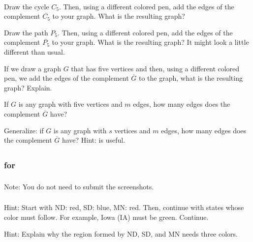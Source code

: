 \begin{exer}[\exerE] %
\label{exer_size_graph_comp}
~
    \begin{exerpart}
        \item Draw the cycle $C_5$. Then, using a different colored pen, add the edges of the complement $\overline{C_5}$ to your graph. What is the resulting graph?
        \item Draw the path $P_5$. Then, using a different colored pen, add the edges of the complement $\overline{P_5}$ to your graph. What is the resulting graph?  It might look a little different than usual.
        \item If we draw a graph $G$ that has five vertices and then, using a different colored pen, we add the edges of the complement $\overline{G}$ to the graph, what is the resulting graph?  Explain.
        \item If $G$ is any graph with five vertices and $m$ edges, how many edges does the complement $\overline{G}$ have?
        \item Generalize: if $G$ is any graph with $s$ vertices and $m$ edges, how many edges does the complement $\overline{G}$ have?  Hint:  is useful.   
    \end{exerpart}
\end{exer}

\subsection{\answers}

\subsubsection{\answers for  \subcolormaps}

\subsubsection*{ \answers}
Note: You do not need to submit the screenshots.

\subsubsection*{ \answers}
\begin{apart}
    \item Hint: Start with ND: red, SD: blue, MN: red.  Then, continue with states whose color must follow.  For example, Iowa (IA) must be green.  Continue.
    \item Hint: Explain why the region formed by ND, SD, and MN needs three colors.
\end{apart}


